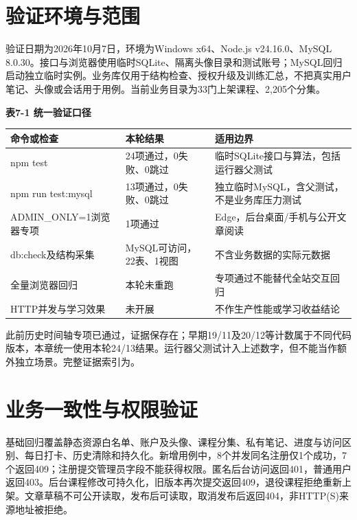 \documentclass[UTF8,12pt,a4paper,oneside,openany]{ctexbook}
\begin{document}
\section{验证环境与范围}

验证日期为2026年10月7日，环境为Windows x64、Node.js v24.16.0、MySQL 8.0.30。接口与浏览器使用临时SQLite、隔离头像目录和测试账号；MySQL回归启动独立临时实例。业务库仅用于结构检查、授权升级及训练汇总，不把真实用户笔记、头像或会话用于用例。当前业务目录为33门上架课程、2,205个分集。



\noindent\textbf{表7-1 统一验证口径}

{\small
\begin{longtable}{P{0.32\textwidth}P{0.24\textwidth}P{0.32\textwidth}}
\toprule
命令或检查 & 本轮结果 & 适用边界 \\
\midrule
\endhead
npm test & 24项通过，0失败、0跳过 & 临时SQLite接口与算法，包括运行器父测试 \\
npm run test:mysql & 13项通过，0失败、0跳过 & 独立临时MySQL，含父测试，不是业务库压力测试 \\
ADMIN\_ONLY=1浏览器专项 & 1项通过 & Edge，后台桌面/手机与公开文章阅读 \\
db:check及结构采集 & MySQL可访问，22表、1视图 & 不含业务数据的实际元数据 \\
全量浏览器回归 & 本轮未重跑 & 专项通过不能替代全站交互回归 \\
HTTP并发与学习效果 & 未开展 & 不作生产性能或学习收益结论 \\
\bottomrule
\end{longtable}}

此前历史时间轴专项已通过，证据保存在；早期19/11及20/12等计数属于不同代码版本，本章统一使用本轮24/13结果。运行器父测试计入上述数字，但不能当作额外独立场景。完整证据索引为。


\section{业务一致性与权限验证}

基础回归覆盖静态资源白名单、账户及头像、课程分集、私有笔记、进度与访问区别、每日打卡、历史清除和持久化。新增用例中，8个并发同名注册仅1个成功，7个返回409；注册提交管理员字段不能获得权限。匿名后台访问返回401，普通用户返回403。后台课程修改可持久化，旧版本再次提交返回409，退役课程拒绝重新上架。文章草稿不可公开读取，发布后可读取，取消发布后返回404，非HTTP(S)来源地址被拒绝。
\end{document}
